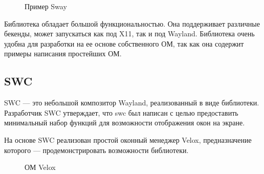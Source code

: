 \begin{figure}[h!]
\caption{Пример Sway}
\label{fig:sway}
\end{figure}

Библиотека обладает большой функциональностью. Она поддерживает различные бекенды, может запускаться как под X11, так и под Wayland. Библиотека очень удобна для разработки на ее основе собственного ОМ, так как она содержит примеры написания простейших ОМ.

\subsection{SWC}
SWC --- это небольшой композитор Wayland, реализованный в виде библиотеки. Разработчик SWC утверждает, что swc был написан с целью предоставить минимальный набор функций для возможности отображения окон на экране.

На основе SWC реализован простой оконный менеджер Velox, предназначение которого --- продемонстрировать возможности библиотеки.

\begin{figure}[h!]
\caption{ОМ Velox}
\label{fig:velox}
\end{figure}

